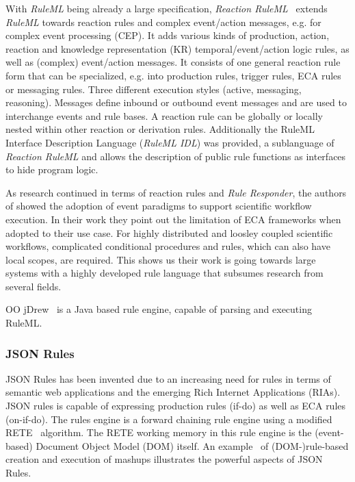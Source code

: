 \documentclass[11pt]{article}%
\begin{document}
With \textit{RuleML} being already a large specification, \textit{Reaction RuleML}~\cite{2012-Paschke_etal-ReactionRuleML.pdf} extends \textit{RuleML} towards reaction rules and complex event/action messages, e.g. for complex event processing (CEP). It adds various kinds of production, action, reaction and knowledge representation (KR) temporal/event/action logic rules, as well as (complex) event/action messages. It consists of one general reaction rule form that can be specialized, e.g. into production rules, trigger rules, ECA rules or messaging rules. Three different execution styles (active, messaging,  reasoning). Messages define inbound or outbound event messages and are used to interchange events and rule bases. A reaction rule can be globally or locally nested within other reaction or derivation rules. Additionally the RuleML Interface Description Language (\textit{RuleML IDL}) was provided, a sublanguage of \textit{Reaction RuleML} and allows the description of public rule functions as interfaces to hide program logic.

As research continued in terms of reaction rules and \textit{Rule Responder}, the authors of \cite{2013_Zhao-Paschke_EDSWE.pdf} showed the adoption of event paradigms to support scientific workflow execution. In their work they point out the limitation of ECA frameworks when adopted to their use case. For highly distributed and loosley coupled scientific workflows, complicated conditional procedures and rules, which can also have local scopes, are required. This shows us their work is going towards large systems with a highly developed rule language that subsumes research from several fields. 

OO jDrew~\cite{2005-Ball_etal-OOjDrew.pdf} is a Java based rule engine, capable of parsing and executing RuleML.






\subsubsection{JSON Rules}
JSON Rules\cite{2008-Giurca_Pascalau-JSON_Rules.pdf} has been invented due to an increasing need for rules in terms of semantic web applications and the emerging Rich Internet Applications (RIAs). JSON rules is capable of expressing production rules (if-do) as well as ECA rules (on-if-do). The rules engine is a forward chaining rule engine using a modified RETE~\cite{1982-Crockford-RETE.pdf} algorithm. The RETE working memory in this rule engine is the (event-based) Document Object Model (DOM) itself. An example~\cite{2009-Pascalau_Giurca-RBACEM.pdf} of (DOM-)rule-based creation and execution of mashups illustrates the powerful aspects of JSON Rules.
\end{document}
